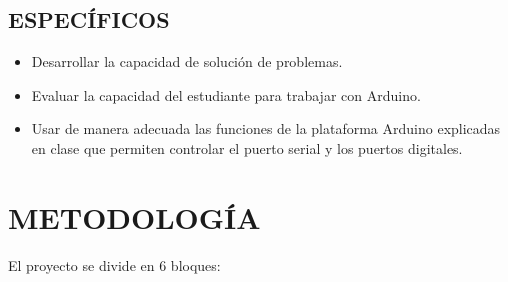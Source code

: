 \documentclass{article}
\begin{document}
\subsection{ESPECÍFICOS}

\begin{itemize}

        \item Desarrollar la capacidad de solución de problemas.
        
        \item Evaluar la capacidad del estudiante para trabajar con Arduino.
        
        \item Usar de manera adecuada las funciones de la
plataforma Arduino explicadas en clase que permiten controlar el puerto serial y los puertos digitales.
\end{itemize}

\section{METODOLOGÍA}

El proyecto se divide en 6 bloques:
\end{document}
